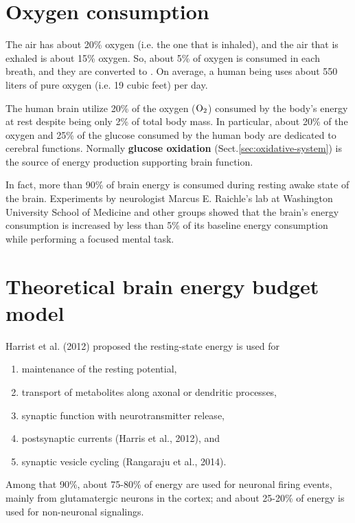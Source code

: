 \section{Oxygen consumption}
\label{sec:brain-resting-energetic-demand}
\label{sec:oxygen-consumption}


The air has about 20\% oxygen (i.e. the one that is inhaled), and the air that
is exhaled is about 15\% oxygen. So, about 5\% of oxygen is consumed in each
breath, and they are converted to . On average, a human being uses
about 550 liters of pure oxygen (i.e. 19 cubic feet) per day.

The human brain utilize 20\% of the oxygen ($\ce{O2}$) consumed by the body's
energy at rest despite being only 2\% of total body mass. In particular, about
20\% of the oxygen and 25\% of the glucose consumed by the human body are
dedicated to cerebral functions. Normally {\bf glucose oxidation}
(Sect.\ref{sec:oxidative-system}) is the source of energy production supporting brain
function.

In fact, more than 90\% of brain energy is consumed during resting awake state
of the brain. Experiments by neurologist Marcus E. Raichle's lab at Washington
University School of Medicine and other groups showed that the brain's energy
consumption is increased by less than 5\% of its baseline energy consumption
while performing a focused mental task.

\section{Theoretical brain energy budget model}

Harrist et al. (2012) proposed the resting-state energy is used for

\begin{enumerate}
  \item maintenance of the resting potential,

  \item transport of metabolites along axonal or dendritic processes,

  \item synaptic function with neurotransmitter release,

  \item postsynaptic currents (Harris et al., 2012), and

  \item synaptic vesicle cycling (Rangaraju et al., 2014).
\end{enumerate}
Among that 90\%, about 75-80\% of energy are used for neuronal firing events,
mainly from glutamatergic neurons in the cortex; and about 25-20\% of energy is
used for non-neuronal signalings.

